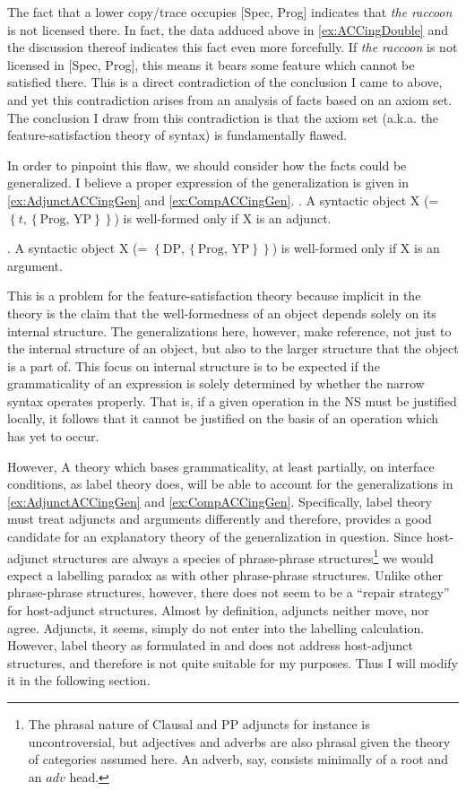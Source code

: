 \documentclass[MilwayThesis]{subfiles}
\begin{document}
The fact that a lower copy/trace occupies [Spec, Prog] indicates that \textit{the raccoon} is not licensed there.
In fact, the data adduced above in \cref{ex:ACCingDouble} and the discussion thereof indicates this fact even more forcefully.
If \textit{the raccoon} is not licensed in [Spec, Prog], this means it bears some feature which cannot be satisfied there.
This is a direct contradiction of the conclusion I came to above, and yet this contradiction arises from an analysis of facts based on an axiom set.
The conclusion I draw from this contradiction is that the axiom set (a.k.a. the feature-satisfaction theory of syntax) is fundamentally flawed.

In order to pinpoint this flaw, we should consider how the facts could be generalized.
I believe a proper expression of the generalization is given in \cref{ex:AdjunctACCingGen} and \cref{ex:CompACCingGen}.
\ex. A syntactic object X (= $\left\{ t, \left\{ \text{Prog, YP}  \right\} \right\}$) is well-formed only if X is an adjunct.\label{ex:AdjunctACCingGen}

\ex. A syntactic object X (= $\left\{ \text{DP}, \left\{ \text{Prog, YP}  \right\} \right\}$) is well-formed only if X is an argument.\label{ex:CompACCingGen}

This is a problem for the feature-satisfaction theory because implicit in the theory is the claim that the well-formedness of an object depends solely on its internal structure.
The generalizations here, however, make reference, not just to the internal structure of an object, but also to the larger structure that the object is a part of.
This focus on internal structure is to be expected if the grammaticality of an expression is solely determined by whether the narrow syntax operates properly.
That is, if a given operation in the NS must be justified locally, it follows that it cannot be justified on the basis of an operation which has yet to occur.

However, A theory which bases grammaticality, at least partially, on interface conditions, as label theory does, will be able to account for the generalizations in \cref{ex:AdjunctACCingGen} and \cref{ex:CompACCingGen}.
Specifically, label theory must treat adjuncts and arguments differently and therefore, provides a good candidate for an explanatory theory of the generalization in question.
Since host-adjunct structures are always a species of phrase-phrase structures\footnote{
	The phrasal nature of Clausal and PP adjuncts for instance is uncontroversial, but adjectives and adverbs are also phrasal given the theory of categories assumed here.
	An adverb, say, consists minimally of a root and an $adv$ head.
}
we would expect a labelling paradox as with other phrase-phrase structures.
Unlike other phrase-phrase structures, however, there does not seem to be a ``repair strategy'' for host-adjunct structures.
Almost by definition, adjuncts neither move, nor agree. 
Adjuncts, it seems, simply do not enter into the labelling calculation.
However, label theory as formulated in \cite{chomsky2013problems} and \cite{chomsky2015problems} does not address host-adjunct structures, and therefore is not quite suitable for my purposes.
Thus I will modify it in the following section.
\end{document}
